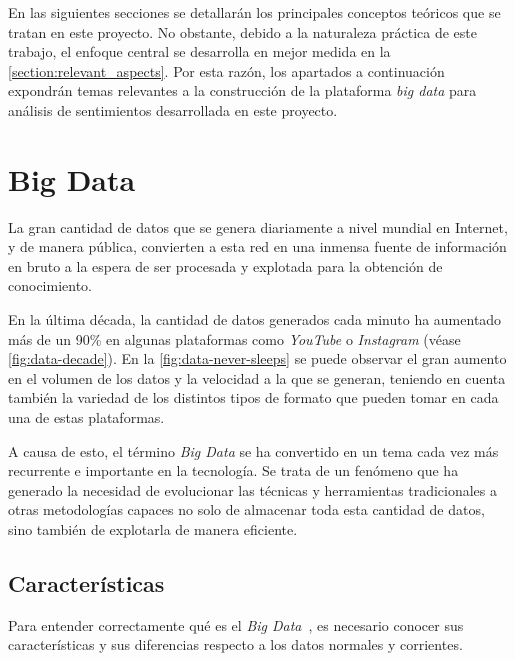 
En las siguientes secciones se detallarán los principales conceptos teóricos que se tratan en este proyecto. No obstante, debido a la naturaleza práctica de este trabajo, el enfoque central se desarrolla en mejor medida en la \autoref{section:relevant_aspects}. Por esta razón, los apartados a continuación expondrán temas relevantes a la construcción de la plataforma \textit{big data} para análisis de sentimientos desarrollada en este proyecto.

\section{Big Data}

La gran cantidad de datos que se genera diariamente a nivel mundial en Internet, y de manera pública, convierten a esta red en una inmensa fuente de información en bruto a la espera de ser procesada y explotada para la obtención de conocimiento.

En la última década, la cantidad de datos generados cada minuto ha aumentado más de un 90\% en algunas plataformas como \textit{YouTube} o \textit{Instagram} (véase \autoref{fig:data-decade}). En la \autoref{fig:data-never-sleeps} se puede observar el gran aumento en el volumen de los datos y la velocidad a la que se generan, teniendo en cuenta también la variedad de los distintos tipos de formato que pueden tomar en cada una de estas plataformas. 



A causa de esto, el término \textit{Big Data} se ha convertido en un tema cada vez más recurrente e importante en la tecnología. Se trata de un fenómeno que ha generado la necesidad de evolucionar las técnicas y herramientas tradicionales a otras metodologías capaces no solo de almacenar toda esta cantidad de datos, sino también de explotarla de manera eficiente.

\subsection{Características}

Para entender correctamente qué es el \textit{Big Data}~\cite{oracleData}, es necesario conocer sus características y sus diferencias respecto a los datos normales y corrientes.

